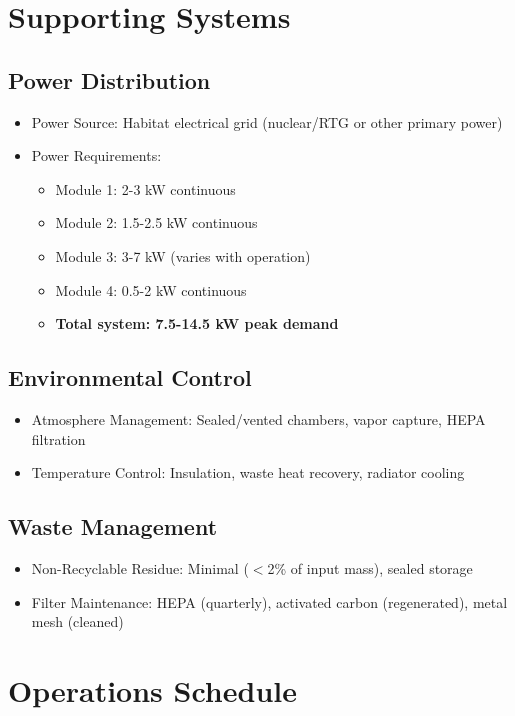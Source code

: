 \documentclass[12pt, a4paper]{article}
\begin{document}
\section{Supporting Systems}

\subsection{Power Distribution}
\begin{itemize}
    \item Power Source: Habitat electrical grid (nuclear/RTG or other primary power)
    \item Power Requirements:
    \begin{itemize}
        \item Module 1: 2-3 kW continuous
        \item Module 2: 1.5-2.5 kW continuous
        \item Module 3: 3-7 kW (varies with operation)
        \item Module 4: 0.5-2 kW continuous
        \item \textbf{Total system: 7.5-14.5 kW peak demand}
    \end{itemize}
\end{itemize}

\subsection{Environmental Control}
\begin{itemize}
    \item Atmosphere Management: Sealed/vented chambers, vapor capture, HEPA filtration
    \item Temperature Control: Insulation, waste heat recovery, radiator cooling
\end{itemize}

\subsection{Waste Management}
\begin{itemize}
    \item Non-Recyclable Residue: Minimal ($<$2\% of input mass), sealed storage
    \item Filter Maintenance: HEPA (quarterly), activated carbon (regenerated), metal mesh (cleaned)
\end{itemize}

\section{Operations Schedule}
\end{document}
